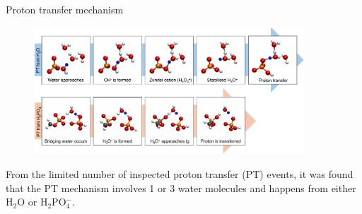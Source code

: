 \documentclass[11pt,t]{beamer}
\begin{document}
\begin{frame}{Proton transfer mechanism}
	\vspace{-10pt}
	\begin{figure}
		\centering
		\includegraphics[width=0.9\textwidth]{Figures/results_proton_transfer.pdf}
	\end{figure}
	\small
	From the limited number of inspected proton transfer (PT) events, it was found that the PT mechanism involves 1 or 3 water molecules and happens from either H$_2$O or H$_2$PO$_4^-$.
\end{frame}



\end{document}

